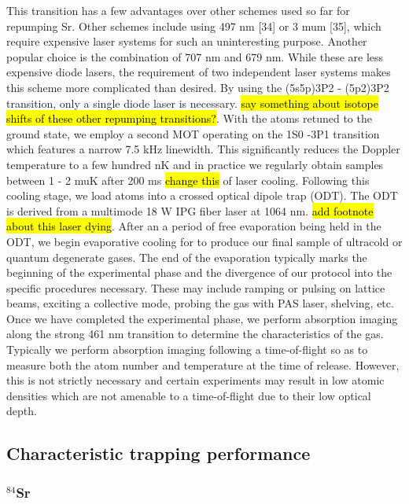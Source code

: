 This transition has a few advantages over other schemes used so far for repumping Sr. 
Other schemes include using 497 nm [34] or 3 mum [35], which require expensive laser systems for such an uninteresting purpose. 
Another popular choice is the combination of 707 nm and 679 nm. 
While these are less expensive diode lasers, the requirement of two independent laser systems makes this scheme more complicated than desired. 
By using the (5s5p)3P2 - (5p2)3P2 transition, only a single diode laser is necessary. \hl{say something about isotope shifts of these other repumping transitions?}. 
With the atoms retuned to the ground state, we employ a second MOT operating on the 1S0 -3P1 transition which features a narrow 7.5 kHz linewidth. 
This significantly reduces the Doppler temperature to a few hundred nK and in practice we regularly obtain samples between 1 - 2 muK after 200 ms \hl{change this} of laser cooling. Following this cooling stage, we load atoms into a crossed optical dipole trap (ODT). 
The ODT is derived from a multimode 18 W IPG fiber laser at 1064 nm. \hl{add footnote about this laser dying}.
After an a period of free evaporation being held in the ODT, we begin evaporative cooling for to produce our final sample of ultracold or quantum degenerate gases.
The end of the evaporation typically marks the beginning of the experimental phase and the divergence of our protocol into the specific procedures necessary. 
These may include ramping or pulsing on lattice beams, exciting a collective mode, probing the gas with PAS laser, shelving, etc. 
Once we have completed the experimental phase, we perform absorption imaging along the strong 461 nm transition to determine the characteristics of the gas. 
Typically we perform absorption imaging following a time-of-flight so as to measure both the atom number and temperature at the time of release. 
However, this is not strictly necessary and certain experiments may result in low atomic densities which are not amenable to a time-of-flight due to their low optical depth.

\subsection{Characteristic trapping performance} \label{sec:benchmark_trapping}

\subsubsection{$^{84}$Sr} \label{sec:84_trapping}

